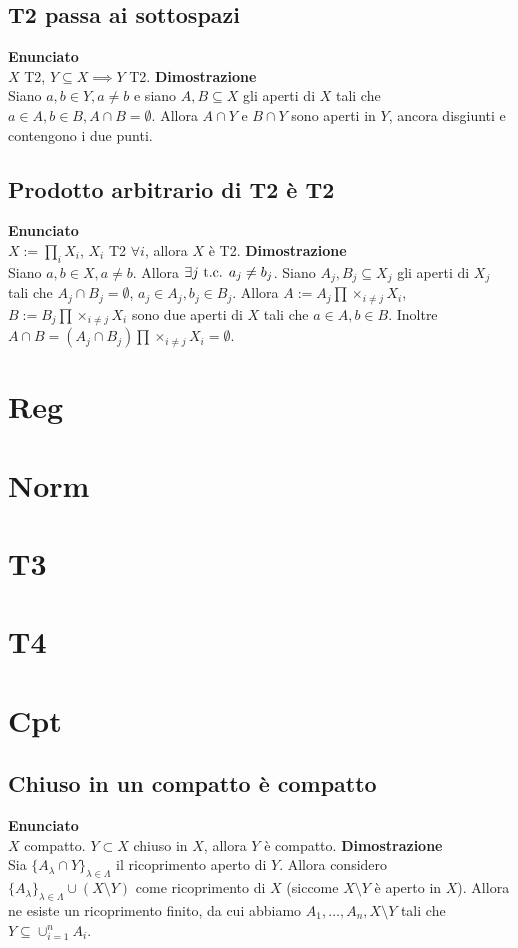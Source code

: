 \documentclass[a4paper,11pt,NoNotes,GeneralMath]{stdmdoc}
\newcommand{\Enunciato}{\vskip 0.05cm \noindent \textbf{Enunciato} \\ }
\renewcommand{\Dimostrazione}{\vskip 0.05cm \noindent \textbf{Dimostrazione} \\ }
\begin{document}
	\subsection*{T2 passa ai sottospazi}
	\Enunciato $X$ T2, $Y \subseteq X \implies Y$ T2.
	\Dimostrazione Siano $a, b \in Y, a \neq b$ e siano $A, B \subseteq X$ gli aperti di $X$ tali che $a \in A, b \in B, A \cap B = \emptyset$. Allora $A \cap Y$ e $B \cap Y$ sono aperti in $Y$, ancora disgiunti e contengono i due punti.

	\subsection*{Prodotto arbitrario di T2 è T2}
	\Enunciato $X := \prod_i X_i$, $X_i$ T2 $\forall i$, allora $X$ è T2.
	\Dimostrazione Siano $a, b \in X, a \neq b$. Allora $\exists j \mbox{ t.c. } a_j \neq b_j$. Siano $A_j, B_j \subseteq X_j$ gli aperti di $X_j$ tali che $A_j \cap B_j = \emptyset$, $a_j \in A_j, b_j \in B_j$. Allora $A := A_j \prod \times_{i \neq j} X_i$, $B := B_j \prod \times_{i \neq j} X_i$ sono due aperti di $X$ tali che $a \in A, b \in B$. Inoltre $A \cap B = (A_j \cap B_j) \prod \times_{i \neq j} X_i = \emptyset$.
	
	\section*{Reg}
	\section*{Norm}
	\section*{T3}
	\section*{T4}
	
	\section*{Cpt}
	\subsection*{Chiuso in un compatto è compatto}
	\Enunciato $X$ compatto. $Y \subset X$ chiuso in $X$, allora $Y$ è compatto.
	\Dimostrazione Sia $\{A_\lambda \cap Y\}_{\lambda \in \Lambda}$ il ricoprimento aperto di $Y$. Allora considero $\{A_\lambda\}_{\lambda \in \Lambda} \cup (X \setminus Y)$ come ricoprimento di $X$ (siccome $X \setminus Y$ è aperto in $X$). Allora ne esiste un ricoprimento finito, da cui abbiamo $A_1, \ldots, A_n, X \setminus Y$ tali che $Y \subseteq \cup_{i=1}^n A_i$.
\end{document}
